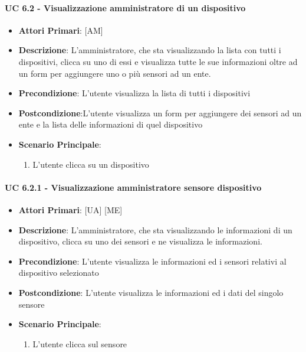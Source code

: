 			\paragraph{UC 6.2 - Visualizzazione amministratore di un dispositivo}
			\begin{itemize}
				\item \textbf{Attori Primari}: [AM]
				\item \textbf{Descrizione}: L'amministratore, che sta visualizzando la lista con tutti i dispositivi, clicca su uno di essi e visualizza tutte le sue informazioni oltre ad un form per aggiungere uno o più sensori ad un ente.
				\item \textbf{Precondizione}: L'utente visualizza la lista di tutti i dispositivi
				\item \textbf{Postcondizione}:L'utente visualizza un form per aggiungere dei sensori ad un ente e la lista delle informazioni di quel dispositivo
				\item \textbf{Scenario Principale}:
				\begin{enumerate}
					\item{L'utente clicca su un dispositivo}
				\end{enumerate}	
			\end{itemize}

			\paragraph{UC 6.2.1 - Visualizzazione amministratore sensore dispositivo}
			\begin{itemize}
				\item \textbf{Attori Primari}: [UA] [ME]
				\item \textbf{Descrizione}: L'amministratore, che sta visualizzando le informazioni di un dispositivo, clicca su uno dei sensori e ne visualizza le informazioni.
				\item \textbf{Precondizione}: L'utente visualizza le informazioni ed i sensori relativi al dispositivo selezionato 
				\item \textbf{Postcondizione}: L'utente visualizza le informazioni ed i dati del singolo sensore
				\item \textbf{Scenario Principale}:
				\begin{enumerate}
					\item{L'utente clicca sul sensore}
				\end{enumerate}	
			\end{itemize}

